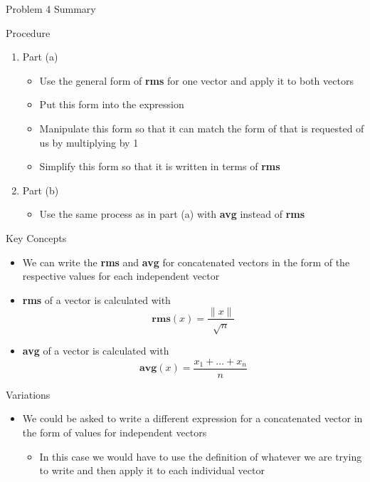 \begin{summary}{Problem 4 Summary}
    \begin{statement}{Procedure}
        \begin{enumerate}[label = (\alph*)]
            \item Part (a)
            \begin{itemize}
                \item Use the general form of \textbf{rms} for one vector and apply it to both vectors
                \item Put this form into the expression
                \item Manipulate this form so that it can match the form of that is requested of us by multiplying by 1
                \item Simplify this form so that it is written in terms of \textbf{rms}
            \end{itemize}
            \item Part (b)
            \begin{itemize}
                \item Use the same process as in part (a) with \textbf{avg} instead of \textbf{rms}
            \end{itemize}
        \end{enumerate}
    \end{statement}
    \begin{statement}{Key Concepts}
        \begin{itemize}
            \item We can write the \textbf{rms} and \textbf{avg} for concatenated vectors in the form of the respective values for each independent vector
            \item \textbf{rms} of a vector is calculated with 
            \begin{equation*}
                \mathbf{rms}(x) = \frac{\|x\|}{\sqrt{n}}
            \end{equation*}
            \item \textbf{avg} of a vector is calculated with
            \begin{equation*}
                \mathbf{avg}(x) = \frac{x_{1} + \dots + x_{n}}{n}
            \end{equation*}
        \end{itemize}
    \end{statement}
    \begin{statement}{Variations}
        \begin{itemize}
            \item We could be asked to write a different expression for a concatenated vector in the form of values for independent vectors
            \begin{itemize}
                \item In this case we would have to use the definition of whatever we are trying to write and then apply it to each individual vector
            \end{itemize}
        \end{itemize}
    \end{statement}
\end{summary}

